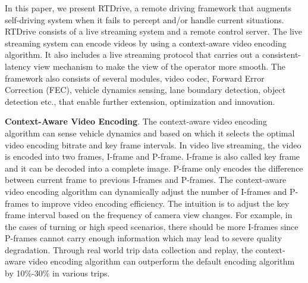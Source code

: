 


In this paper, we present RTDrive, a remote driving framework
that augments self-driving system when it fails to 
percept and/or handle current situations. 
RTDrive consists of a live streaming system
and a remote control server. 
The live streaming system can encode videos by using
a context-aware video encoding algorithm. 
It also includes a live streaming protocol that 
carries out a consistent-latency
view mechanism to make the view of the operator
more smooth. 
The framework also consists of several modules, video codec, 
Forward Error Correction (FEC), vehicle dynamics sensing,
lane boundary detection, object detection etc.,
that enable further extension, optimization and innovation.  



\textbf{Context-Aware Video Encoding}.
The context-aware video encoding algorithm can 
sense vehicle dynamics and based on which it 
selects the optimal video encoding bitrate and key frame intervals. 
In video live streaming, the video is encoded into two
frames, I-frame and P-frame.
I-frame is also called key frame and it can be 
decoded into a complete image. 
P-frame only encodes the difference between current
frame to previous I-frames and P-frames. 
The context-aware video encoding algorithm
can dynamically adjust the number of I-frames
and P-frames to improve video encoding efficiency. 
The intuition is to adjust the key frame interval 
based on the frequency of camera view changes. 
For example, in the cases of turning or high speed scenarios,
there should be more I-frames since P-frames cannot
carry enough information which may lead to severe quality degradation. 
Through real world trip data collection and replay,
the context-aware video encoding algorithm can outperform
the default encoding algorithm by 10\%-30\% in various trips. 

